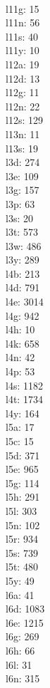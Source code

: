 \begin{multicols}{8}
  \\ l11g: 15
  \\ l11n: 56
  \\ l11s: 40
  \\ l11y: 10
  \\ l12a: 19
  \\ l12d: 13
  \\ l12g: 11
  \\ l12n: 22
  \\ l12s: 129
  \\ l13n: 11
  \\ l13s: 19
  \\ l3d: 274
  \\ l3e: 109
  \\ l3g: 157
  \\ l3p: 63
  \\ l3s: 20
  \\ l3t: 573
  \\ l3w: 486
  \\ l3y: 289
  \\ l4b: 213
  \\ l4d: 791
  \\ l4e: 3014
  \\ l4g: 942
  \\ l4h: 10
  \\ l4k: 658
  \\ l4n: 42
  \\ l4p: 53
  \\ l4s: 1182
  \\ l4t: 1734
  \\ l4y: 164
  \\ l5a: 17
  \\ l5c: 15
  \\ l5d: 371
  \\ l5e: 965
  \\ l5g: 114
  \\ l5h: 291
  \\ l5l: 303
  \\ l5n: 102
  \\ l5r: 934
  \\ l5s: 739
  \\ l5t: 480
  \\ l5y: 49
  \\ l6a: 41
  \\ l6d: 1083
  \\ l6e: 1215
  \\ l6g: 269
  \\ l6h: 66
  \\ l6l: 31
  \\ l6n: 315

\end{multicols}
